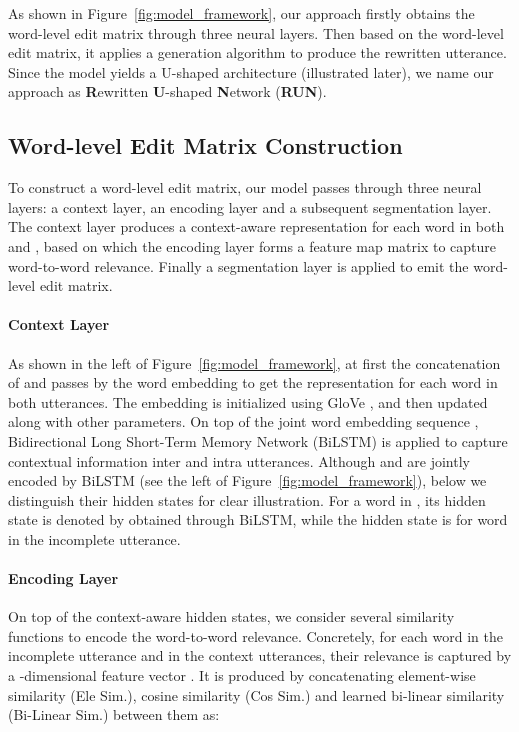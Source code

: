\documentclass[11pt,a4paper]{article}
\begin{document}
As shown in Figure~\ref{fig:model_framework}, our approach firstly obtains the word-level edit matrix through three neural layers. Then based on the word-level edit matrix, it applies a generation algorithm to produce the rewritten utterance. Since the model yields a U-shaped architecture (illustrated later), we name our approach as \textbf{R}ewritten \textbf{U}-shaped \textbf{N}etwork (\textbf{RUN}).

\subsection{Word-level Edit Matrix Construction}

To construct a word-level edit matrix, our model passes through three neural layers: a context layer, an encoding layer and a subsequent segmentation layer. The context layer produces a context-aware representation for each word in both  and , based on which the encoding layer forms a feature map matrix  to capture word-to-word relevance. Finally a segmentation layer is applied to emit the word-level edit matrix.

\paragraph{Context Layer} As shown in the left of Figure~\ref{fig:model_framework}, at first the concatenation of  and  passes by the word embedding  to get the representation for each word in both utterances. The embedding is initialized using GloVe \cite{pennington-etal-2014-glove}, and then updated along with other parameters. On top of the joint word embedding sequence , Bidirectional Long Short-Term Memory Network (BiLSTM) \cite{hochreiter1997long,schuster1997bidirectional} is applied to capture contextual information inter and intra utterances.
Although  and  are jointly encoded by BiLSTM (see the left of Figure~\ref{fig:model_framework}), below we distinguish their hidden states for clear illustration.
For a word  in , its hidden state is denoted by  obtained through BiLSTM, while the hidden state  is for word  in the incomplete utterance.

\paragraph{Encoding Layer} On top of the context-aware hidden states, we consider several similarity functions to encode the word-to-word relevance. Concretely, for each word  in the incomplete utterance and  in the context utterances, their relevance is captured by a -dimensional feature vector . It is produced by concatenating element-wise similarity (Ele Sim.), cosine similarity (Cos Sim.) and learned bi-linear similarity (Bi-Linear Sim.) between them as:
\end{document}
